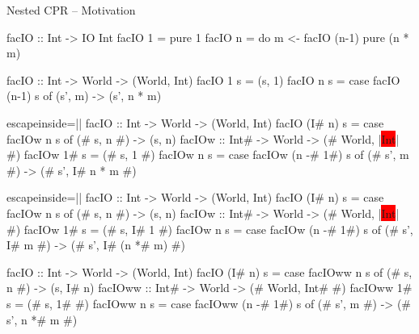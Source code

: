 \documentclass{haskellbeamer}
\begin{document}
\begin{frame}[fragile]{Nested CPR -- Motivation}
  \begin{center}
    \begin{minipage}{0.7\textwidth}
      \begin{overprint}
        \begin{haskell}
          facIO :: Int -> IO Int
          facIO 1 = pure 1
          facIO n = do
            m <- facIO (n-1)
            pure (n * m)
        \end{haskell}
        \begin{haskell}
          facIO :: Int -> World -> (World, Int)
          facIO 1 s = (s, 1)
          facIO n s = case facIO (n-1) s of
            (s', m) -> (s', n * m)
        \end{haskell}
        \begin{haskell*}{escapeinside=||}
          facIO :: Int -> World -> (World, Int)
          facIO (I# n) s = case facIOw n s of
            (# s, n #) -> (s, n)
          facIOw  :: Int# -> World -> (# World, |\colorbox{red}{Int}| #)
          facIOw  1# s = (# s, 1 #)
          facIOw  n s = case facIOw (n -# 1#) s of
            (# s', m #) -> (# s', I# n * m #)
        \end{haskell*}
        \begin{haskell*}{escapeinside=||}
          facIO :: Int -> World -> (World, Int)
          facIO (I# n) s = case facIOw n s of
            (# s, n #) -> (s, n)
          facIOw  :: Int# -> World -> (# World, |\colorbox{red}{Int}| #)
          facIOw  1# s = (# s, I# 1 #)
          facIOw  n s = case facIOw (n -# 1#) s of
            (# s', I# m #) -> (# s', I# (n *# m) #)
        \end{haskell*}
        \begin{haskell}
          facIO :: Int -> World -> (World, Int)
          facIO (I# n) s = case facIOww n s of
            (# s, n #) -> (s, I# n)
          facIOww :: Int# -> World -> (# World, Int# #)
          facIOww 1# s = (# s, 1# #)
          facIOww n s = case facIOww (n -# 1#) s of
            (# s', m #) -> (# s', n *# m #)
        \end{haskell}
      \end{overprint}
    \end{minipage}
  \end{center}
\end{frame}
\end{document}
